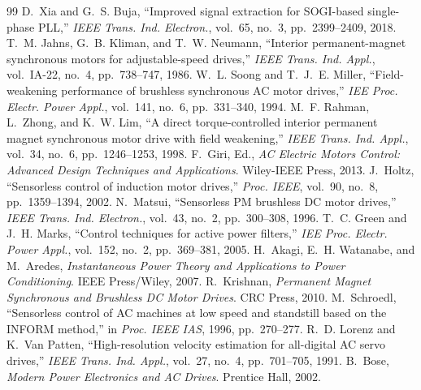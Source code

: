 \documentclass[10pt,twoside,a4paper]{article}
\begin{document}
\begin{thebibliography}{99}
 D.~Xia and G.~S. Buja, ``Improved signal extraction for SOGI-based single-phase PLL,'' \emph{IEEE Trans. Ind. Electron.}, vol.~65, no.~3, pp.~2399--2409, 2018.
 T.~M. Jahns, G.~B. Kliman, and T.~W. Neumann, ``Interior permanent-magnet synchronous motors for adjustable-speed drives,'' \emph{IEEE Trans. Ind. Appl.}, vol.~IA-22, no.~4, pp.~738--747, 1986.
 W.~L. Soong and T.~J.~E. Miller, ``Field-weakening performance of brushless synchronous AC motor drives,'' \emph{IEE Proc. Electr. Power Appl.}, vol.~141, no.~6, pp.~331--340, 1994.
 M.~F. Rahman, L.~Zhong, and K.~W. Lim, ``A direct torque-controlled interior permanent magnet synchronous motor drive with field weakening,'' \emph{IEEE Trans. Ind. Appl.}, vol.~34, no.~6, pp.~1246--1253, 1998.
 F.~Giri, Ed., \emph{AC Electric Motors Control: Advanced Design Techniques and Applications}. Wiley-IEEE Press, 2013.
 J.~Holtz, ``Sensorless control of induction motor drives,'' \emph{Proc. IEEE}, vol.~90, no.~8, pp.~1359--1394, 2002.
 N.~Matsui, ``Sensorless PM brushless DC motor drives,'' \emph{IEEE Trans. Ind. Electron.}, vol.~43, no.~2, pp.~300--308, 1996.
 T.~C. Green and J.~H. Marks, ``Control techniques for active power filters,'' \emph{IEE Proc. Electr. Power Appl.}, vol.~152, no.~2, pp.~369--381, 2005.
 H.~Akagi, E.~H. Watanabe, and M.~Aredes, \emph{Instantaneous Power Theory and Applications to Power Conditioning}. IEEE Press/Wiley, 2007.
 R.~Krishnan, \emph{Permanent Magnet Synchronous and Brushless DC Motor Drives}. CRC Press, 2010.
 M.~Schroedl, ``Sensorless control of AC machines at low speed and standstill based on the INFORM method,'' in \emph{Proc. IEEE IAS}, 1996, pp.~270--277.
 R.~D. Lorenz and K.~Van Patten, ``High-resolution velocity estimation for all-digital AC servo drives,'' \emph{IEEE Trans. Ind. Appl.}, vol.~27, no.~4, pp.~701--705, 1991.
 B.~Bose, \emph{Modern Power Electronics and AC Drives}. Prentice Hall, 2002.
\end{thebibliography}
\endgroup
\end{document}
